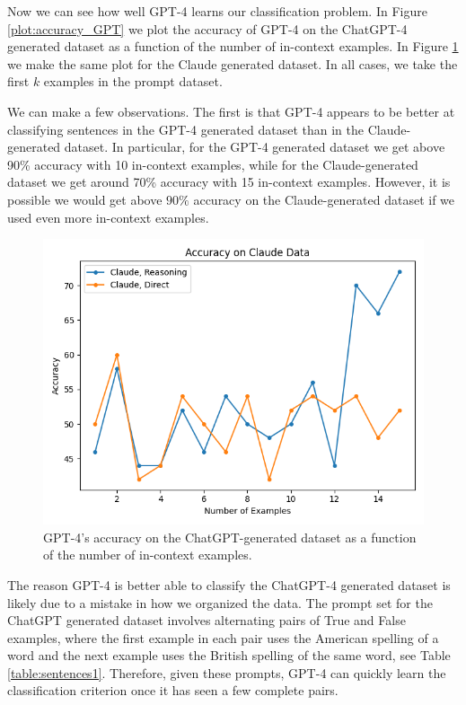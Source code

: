 \documentclass{article}
\begin{document}
Now we can see how well GPT-4 learns our classification problem. In Figure \ref{plot:accuracy_GPT} we plot the accuracy of GPT-4 on the ChatGPT-4 generated dataset as a function of the number of in-context examples. 
In Figure \ref{plot:accuracy_claude} we make the same plot for the Claude generated dataset. In all cases, we take the first $k$ examples in the prompt dataset.

We can make a few observations. 
The first is that GPT-4 appears to be better at classifying sentences in the GPT-4 generated dataset than in the Claude-generated dataset.
In particular, for the GPT-4 generated dataset we get above 90\% accuracy with 10 in-context examples, while for the Claude-generated dataset we get around 70\% accuracy with 15 in-context examples.
However, it is possible we would get above $90\%$ accuracy on the Claude-generated dataset if we used even more in-context examples.

\begin{figure}
\centering
\includegraphics[scale=.6]{./figures/accuracy_claude.png}
\caption{GPT-4's accuracy on the ChatGPT-generated dataset as a function of the number of in-context examples.}
\label{plot:accuracy_claude}
\end{figure}

The reason GPT-4 is better able to classify the ChatGPT-4 generated dataset is likely due to a mistake in how we organized the data.
The prompt set for the ChatGPT generated dataset involves alternating pairs of True and False examples, where the first example in each pair uses the American spelling of a word and the next example uses the British spelling of the same word, see Table \ref{table:sentences1}.
Therefore, given these prompts, GPT-4 can quickly learn the classification criterion once it has seen a few complete pairs.
\end{document}
